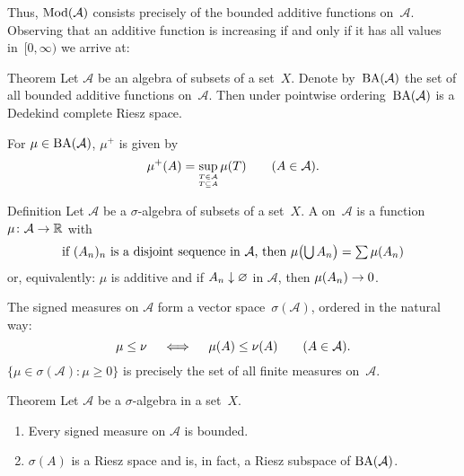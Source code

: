\documentclass[main.tex]{subfiles}
\begin{document}
Thus, $\mathrm{Mod}(\mathcal A)$ consists precisely of
the bounded additive functions on~$\mathcal A$.
Observing that an additive function is increasing
if and only if it has all values in~$[0,\infty)$
we arrive at:
\begin{psec}{Theorem}
\label{1.12}
Let $\mathcal A$ be an algebra of subsets
of a set~$X$.
Denote by~$\mathrm{BA}(\mathcal A)$ 
the set of all bounded additive functions on~$\mathcal A$.
Then under pointwise ordering~$\mathrm{BA}(\mathcal A)$
is a Dedekind complete Riesz space.
\end{psec}
For $\mu \in \mathrm{BA}(\mathcal A)$, $\mu^+$ is given by
\begin{equation*}
\mu^+(A) 
  = \sup_{\substack{\scriptscriptstyle T\in \mathcal{A} \\
		    \scriptscriptstyle T\subseteq A}} \mu(T)
  \qquad (A\in\mathcal A)
\textnormal{.}
\end{equation*}
%
%
\begin{psec}{Definition}
\label{1.13}
Let $\mathcal A$ be a $\sigma$-algebra 
of subsets of a set~$X$.
A  on~$\mathcal A$
is a function~$\mu\colon\mathcal A \rightarrow \mathbb{R}$ with
\begin{equation*}
\textstyle{\ensuremath{\textnormal{if }}(A_n)_n\ensuremath{\textnormal{ is a disjoint sequence in }}\mathcal{A}
\ensuremath{\textnormal{, then }}\mu\bigl(\bigcup A_n\bigr)=\sum\mu(A_n)}
\end{equation*}
or, equivalently: 
$\mu$ is additive
and if $A_n\downarrow \varnothing$ in $\mathcal A$,
then $\mu(A_n)\rightarrow 0$.

The signed measures on $\mathcal A$ form 
a vector space~$\sigma(\mathcal A)$,
ordered in the natural way:
\begin{equation*}
\mu \leq \nu 
  \quad \iff \quad
  \mu(A)\leq\nu(A)\qquad (A\in\mathcal A)
\textnormal{.}
\end{equation*}
$\{ \mu\in \sigma(\mathcal A)\colon \mu \ge 0\}$
is precisely the set of all finite measures on~$\mathcal A$.
\end{psec}
%
%
\begin{psec}{Theorem}
Let $\mathcal{A}$ be a $\sigma$-algebra in a set~$X$.
\begin{enumerate}
\item
\label{1.14-1}
Every signed measure on $\mathcal A$ is bounded.
%
\item
\label{1.14-2}
$\sigma(A)$ is a Riesz space and is, 
in fact,
a Riesz subspace of $\mathrm{BA}(\mathcal A)$.
\end{enumerate}
\end{psec}
\end{document}
